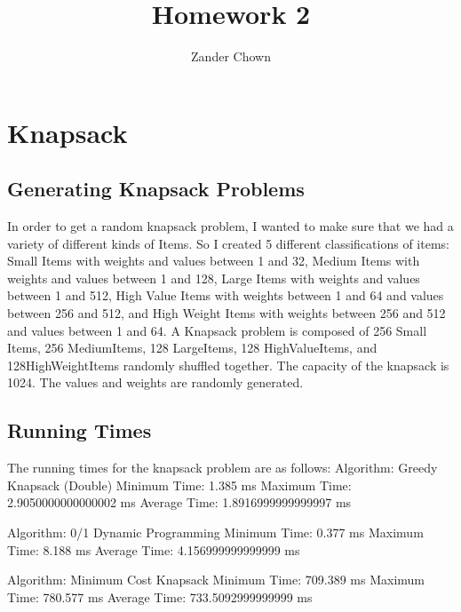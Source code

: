 \documentclass{article}
\title{Homework 2}
\author{Zander Chown}
\begin{document}
\maketitle

\section*{Knapsack}
\subsection*{Generating Knapsack Problems}
In order to get a random knapsack problem, I wanted to make sure that we had a variety of different kinds of Items. So I created 5 different classifications of items: Small Items with weights and values between 1 and 32, Medium Items with weights and values between 1 and 128, Large Items with weights and values between 1 and 512, High Value Items with weights between 1 and 64 and values between 256 and 512, and High Weight Items with weights between 256 and 512 and values between 1 and 64. A Knapsack problem is composed of 256 Small Items, 256 MediumItems, 128 LargeItems, 128 HighValueItems, and 128HighWeightItems randomly shuffled together. The capacity of the knapsack is 1024. The values and weights are randomly generated.

\subsection*{Running Times}
The running times for the knapsack problem are as follows: \newline
Algorithm: Greedy Knapsack (Double) \newline
  Minimum Time: 1.385 ms \newline
  Maximum Time: 2.9050000000000002 ms \newline
  Average Time: 1.8916999999999997 ms \newline

Algorithm: 0/1 Dynamic Programming \newline
  Minimum Time: 0.377 ms \newline
  Maximum Time: 8.188 ms \newline
  Average Time: 4.156999999999999 ms \newline

Algorithm: Minimum Cost Knapsack \newline
  Minimum Time: 709.389 ms \newline
  Maximum Time: 780.577 ms \newline
  Average Time: 733.5092999999999 ms \newline
\end{document}
